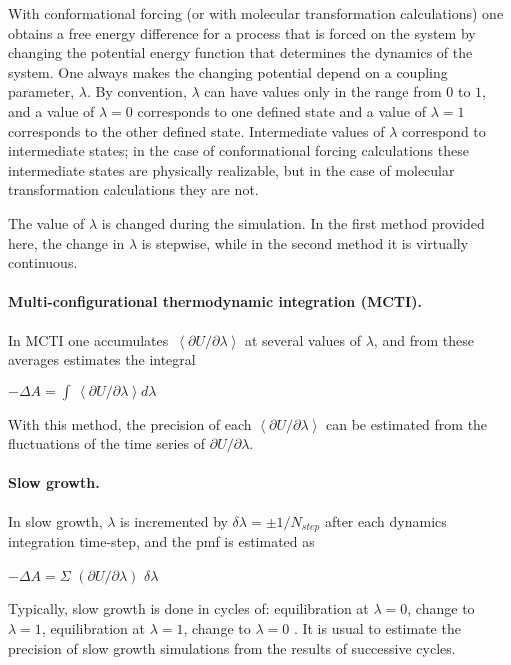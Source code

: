 With conformational forcing (or with molecular transformation calculations)
one obtains a free energy difference for a process that is forced on the
system by changing the potential energy function that determines the
dynamics of the system. One always makes the changing potential depend on a
coupling parameter, $\lambda $. By convention, $\lambda $ can have values
only in the range from $0$ to $1$, and a value of $\lambda =0$ corresponds
to one defined state and a value of $\lambda =1$ corresponds to the other
defined state. Intermediate values of $\lambda $ correspond to intermediate
states; in the case of conformational forcing calculations these
intermediate states are physically realizable, but in the case of molecular
transformation calculations they are not.

The value of $\lambda $ is changed during the simulation. In the first
method provided here, the change in $\lambda $ is stepwise, while in the
second method it is virtually continuous.\medskip

\paragraph*{Multi-configurational thermodynamic integration (MCTI).}

In MCTI one accumulates $\,\left\langle \partial U/\partial \lambda
\right\rangle $ at several values of $\lambda $, and from these averages
estimates the integral

\qquad \qquad \qquad \qquad $-\Delta A=\int \,\left\langle \partial U/%
\partial \lambda \right\rangle d\lambda $

With this method, the precision of each $\left\langle \partial U/\partial %
\lambda \right\rangle $ can be estimated from the fluctuations of the time
series of $\partial U/\partial \lambda $.\bigskip 

\paragraph*{Slow growth.}

In slow growth, $\lambda $ is incremented by $\delta \lambda =\pm 1/N_{step}$
after each dynamics integration time-step, and the pmf is estimated as

\qquad \qquad \qquad \qquad $-\Delta A=\Sigma $ $\left( \partial U/\partial
\lambda \right) $ $\delta \lambda $

Typically, slow growth is done in cycles of: equilibration at $\lambda =0$,
change to $\lambda =1$, equilibration at $\lambda =1$, change to $\lambda =0$%
. It is usual to estimate the precision of slow growth simulations from the
results of successive cycles.\pagebreak 

